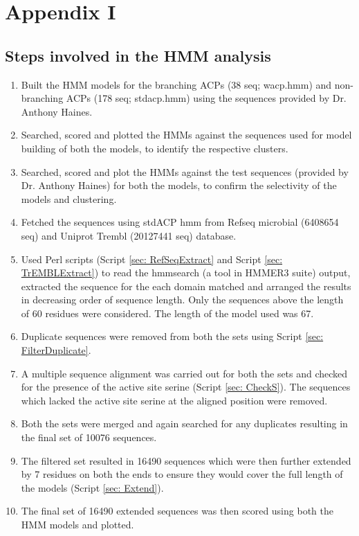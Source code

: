 \chapter{Appendix I}
\label{cha:AppendixI}
\begin{singlespacing}

\section{Steps involved in the HMM analysis}
\begin{enumerate}[label=Step \arabic*., align=left, leftmargin=*]

\item Built the HMM models for the branching ACPs (38 seq; wacp.hmm) and non-branching ACPs (178 seq; stdacp.hmm) using the sequences provided by Dr. Anthony Haines.
\item Searched, scored and plotted the HMMs against the sequences used for model building of both the models, to identify the respective clusters.
\item Searched, scored and plot the HMMs against the test sequences (provided by Dr. Anthony Haines) for both the models, to confirm the selectivity of the models and clustering.
\item Fetched the sequences using stdACP hmm from Refseq microbial (6408654 seq) and Uniprot Trembl (20127441 seq) database. 
\item Used Perl scripts (Script \ref{sec: RefSeqExtract} and Script \ref{sec: TrEMBLExtract}) to read the hmmsearch (a tool in HMMER3 suite) output, extracted the sequence for the each domain matched and arranged the results in decreasing order of sequence length. Only the sequences above the length of 60 residues were considered. The length of the model used was 67.
\item Duplicate sequences were removed from both the sets using Script \ref{sec: FilterDuplicate}.
\item A multiple sequence alignment was carried out for both the sets and checked for the presence of the active site serine (Script \ref{sec: CheckS}). The sequences which lacked the active site serine at the aligned position were removed.
\item Both the sets were merged and again searched for any duplicates resulting in the final set of 10076 sequences.
\item The filtered set resulted in 16490 sequences which were then further extended by 7 residues on both the ends to ensure they would cover the full length of the models (Script \ref{sec: Extend}). 
\item The final set of 16490 extended sequences was then scored using both the HMM models and plotted.
\end{enumerate}


\end{singlespacing}
